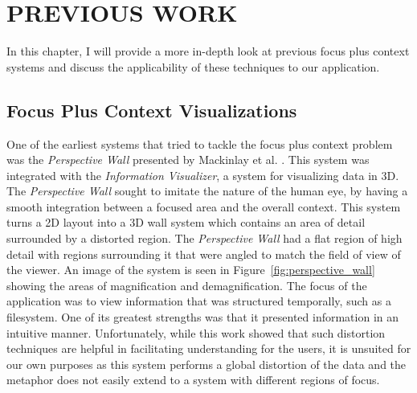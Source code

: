 
 
\chapter{PREVIOUS WORK}
\label{chapter:previous_work}

In this chapter, I will provide a more in-depth look at previous focus plus context systems and discuss the applicability of these techniques to our application.

\section{Focus Plus Context Visualizations}
\label{section:prev_fc_vis}

One of the earliest systems that tried to tackle the focus plus context problem was the \emph{Perspective Wall} presented by Mackinlay et al. \cite{Mackinlay1991}. This system was integrated with the \emph{Information Visualizer}, a system for visualizing data in 3D. The \emph{Perspective Wall} sought to imitate the nature of the human eye, by having a smooth integration between a focused area and the overall context. This system turns a 2D layout into a 3D wall system which contains
an area of detail surrounded by a distorted region. The \emph{Perspective Wall} had a flat region of high detail with regions surrounding it that were angled to match the field of view of the viewer. An image of the system is seen in Figure~\ref{fig:perspective_wall} showing the areas of magnification and demagnification. The focus of the application was to view information that was structured temporally, such as a filesystem. One of its greatest strengths was that it presented information in an intuitive manner. Unfortunately, while this work showed that such distortion techniques are helpful in facilitating understanding for the users, it is unsuited for our own purposes as this system performs a global distortion of the data and the metaphor does not easily extend to a system with different regions of focus.

